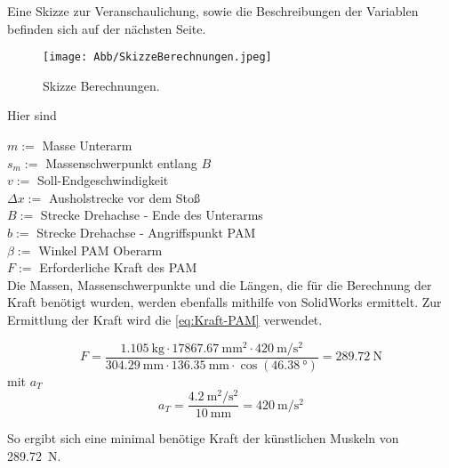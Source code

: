 		Eine Skizze zur Veranschaulichung, sowie die Beschreibungen der Variablen befinden sich auf der nächsten Seite. 

		\newpage
		\begin{figure}[h]
			\centering
			\texttt{[image: Abb/SkizzeBerechnungen.jpeg]}
			\caption{Skizze Berechnungen.}%
			\label{fig:SkizzeBerechnungen}
		\end{figure}

		Hier sind

		\( m := \) Masse Unterarm \\
		\( s_m := \) Massenschwerpunkt entlang $ B $ \\
		\( v := \) Soll-Endgeschwindigkeit \\
		\( \Delta x := \) Ausholstrecke vor dem Stoß \\
		\( B := \) Strecke Drehachse - Ende des Unterarms \\
		\( b:= \) Strecke Drehachse - Angriffspunkt PAM \\
		\( \beta := \) Winkel PAM  Oberarm \\
		\( F:= \) Erforderliche Kraft des PAM\\

		Die Massen, Massenschwerpunkte und die Längen, die für die Berechnung der Kraft benötigt wurden, werden ebenfalls mithilfe von SolidWorks ermittelt. 
		Zur Ermittlung der Kraft wird die \cref{eq:Kraft-PAM} verwendet. 

		\begin{equation}
			F =\frac{\SI{1,105}{\kilogram} \cdot \SI{17867,67}{\milli\metre\squared} \cdot \SI{420}{\metre\per\second\squared}}{\SI{304,29}{\milli\metre} \cdot \SI{136,35}{\milli\metre} \cdot \cos{\left(\SI{46,38}{\degree}\right)}} = \SI{289,72}{\newton}
		\end{equation}
		mit \(a_T\)
		\begin{equation}
			a_T = \frac{\SI{4,2}{\metre\squared\per\second\squared}}{\SI{10}{\milli\metre}} = \SI{420}{\metre\per\second\squared}
		\end{equation}
		
		So ergibt sich eine minimal benötige Kraft der künstlichen Muskeln von \SI{289,72}{\newton}.
